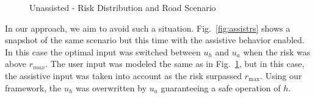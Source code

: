 \documentclass[letterpaper, 10 pt, conference]{ieeeconf}  %
\begin{document}
\begin{figure}[ht!]
	\centering
	\vspace{-5pt}
	\caption{Unassisted - Risk Distribution and Road Scenario}
	\label{fig:noassist}
	\vspace{-10pt}
\end{figure}
In our approach, we aim to avoid such a situation. Fig.~\ref{fig:assistrs} shows a snapshot of the same scenario but this time with the assistive behavior enabled. In this case the optimal input was switched between $u_h$ and $u_a$ when the risk was above $r_{max}$. 
The user input was modeled the same as in Fig.~\ref{fig:noassist}, but in this case, the assistive input was taken into account as the risk surpassed $r_{\max}$. Using our framework, the $u_h$ was overwritten by $u_a$ guaranteeing a safe operation of $h$.
\end{document}
